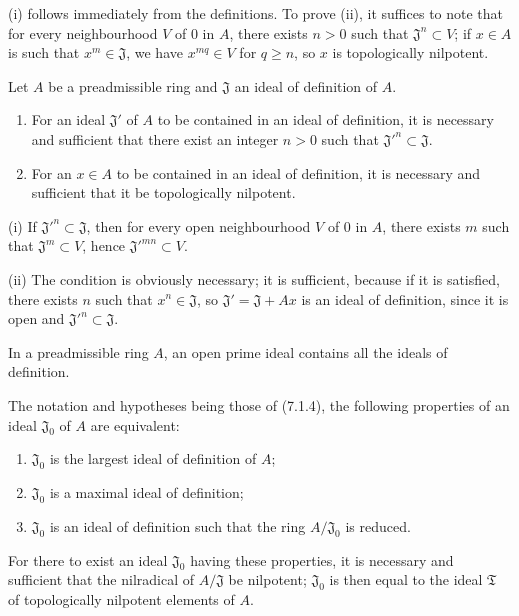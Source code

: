(i) follows immediately from the definitions. To prove (ii), it suffices to
note that for every neighbourhood $V$ of $0$ in $A$, there exists $n>0$ such that
$\mathfrak J^n\subset V$; if $x\in A$ is such that $x^m\in\mathfrak J$, we have
$x^{mq}\in V$ for $q\geq n$, so $x$ is topologically nilpotent.

\begin{proposition}[7.1.4]
\label{0.7.1.4}
Let $A$ be a preadmissible ring and $\mathfrak J$ an ideal of definition of
$A$.
\begin{enumerate}
  \item[{\upshape(i)}] For an ideal $\mathfrak J'$ of $A$ to be contained
    in an ideal of definition, it is necessary and sufficient that there exist an integer
    $n>0$ such that ${\mathfrak J'}^n\subset\mathfrak J$.
  \item[{\upshape(ii)}] For an $x\in A$ to be contained in an ideal of
    definition, it is necessary and sufficient that it be topologically nilpotent.
\end{enumerate}
\end{proposition}

(i) If ${\mathfrak J'}^n\subset\mathfrak J$, then for every open neighbourhood $V$ of
$0$ in $A$, there exists $m$ such that $\mathfrak J^m\subset V$, hence
${\mathfrak J'}^{mn}\subset V$.

(ii) The condition is obviously necessary; it is sufficient, because if it
is satisfied, there exists $n$ such that $x^n\in\mathfrak J$, so
$\mathfrak J'=\mathfrak J+Ax$ is an ideal of definition, since it is open
and ${\mathfrak J'}^n\subset\mathfrak J$.

\begin{corollary}[7.1.5]
\label{0.7.1.5}
In a preadmissible ring $A$, an open prime ideal contains all the
ideals of definition.
\end{corollary}

\begin{corollary}[7.1.6]
\label{0.7.1.6}
The notation and hypotheses being those of (7.1.4), the following properties
of an ideal $\mathfrak J_0$ of $A$ are equivalent:
\begin{enumerate}
  \item[$a)$] $\mathfrak J_0$ is the largest ideal of definition of $A$;
  \item[$b)$] $\mathfrak J_0$ is a maximal ideal of definition;
  \item[$c)$] $\mathfrak J_0$ is an ideal of definition such that the ring
    $A/\mathfrak J_0$ is reduced.
\end{enumerate}
For there to exist an ideal $\mathfrak J_0$ having these properties, it is necessary and
sufficient that the nilradical of $A/\mathfrak J$ be nilpotent; $\mathfrak J_0$
is then equal to the ideal $\mathfrak T$ of topologically nilpotent elements
of $A$.
\end{corollary}

